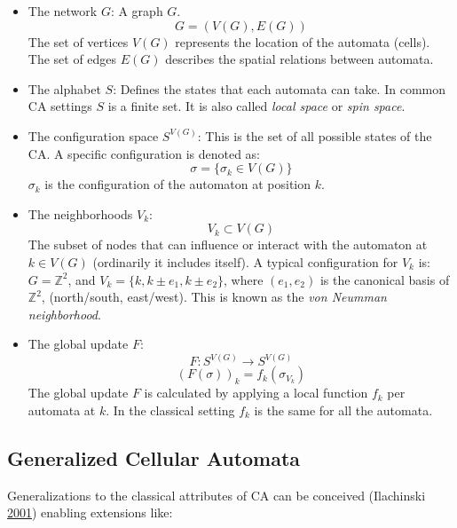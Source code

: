 \documentclass[
]{book}
\begin{document}
\begin{itemize}
\item
  The network \(G\):
  A graph \(G\).
  \[ G = (V(G), E(G)) \]
  The set of vertices \(V(G)\) represents the location of the automata (cells). The set of edges \(E(G)\) describes the spatial relations between automata.
\item
  The alphabet \(S\):
  Defines the states that each automata can take. In common CA settings \(S\) is a finite set. It is also called \emph{local space} or \emph{spin space}.
\item
  The configuration space \(S^{V(G)}\):
  This is the set of all possible states of the CA. A specific configuration is denoted as:
  \[ \sigma = \{\sigma_k \in V(G)\} \]
  \(\sigma_k\) is the configuration of the automaton at position \(k\).
\item
  The neighborhoods \(V_k\):
  \[ V_k \subset  V(G) \]
  The subset of nodes that can influence or interact with the automaton at \(k \in V(G)\) (ordinarily it includes itself). A typical configuration for \(V_k\) is: \(G = \mathds{Z}^2\), and \(V_k = \{k, k \pm e_1, k \pm e_2\}\), where \((e_1, e_2)\) is the canonical basis of \(\mathds{Z}^2\), (north/south, east/west). This is known as the \emph{von Neumman neighborhood}.
\item
  The global update \(F\):
  \[ F: S^{V(G)} \rightarrow S^{V(G)} \]
  \[ (F(\sigma))_k = f_k(\sigma_{V_k}) \]
  The global update \(F\) is calculated by applying a local function \(f_k\) per automata at \(k\). In the classical setting \(f_k\) is the same for all the automata.
\end{itemize}

\hypertarget{generalized-cellular-automata}{%
\subsection{Generalized Cellular Automata}\label{generalized-cellular-automata}}

Generalizations to the classical attributes of CA can be conceived (Ilachinski \protect\hyperlink{ref-ilachinski2001cellular}{2001}) enabling extensions like:
\end{document}
